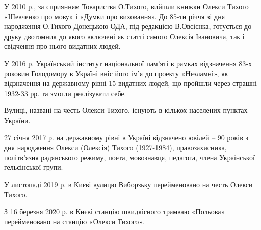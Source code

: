 У 2010 р., за сприянням Товариства О.Тихого, вийшли книжки Олекси Тихого
«Шевченко про мову» і «Думки про виховання». До 85-ти річчя зі дня народження
О.Тихого Донецькою ОДА, під редакцією В.Овсієнка, готується до друку двотомник
до якого включені як статті самого Олексія Івановича, так і свідчення про нього
видатних людей.

У 2016 р. Український інститут національної пам'яті в рамках відзначення 83-х
роковин Голодомору в Україні вніс його ім'я до проекту «Незламні», як
відзначення на державному рівні 15 видатних людей, що пройшли через страшні
1932-33 рр. та змогли реалізувати себе.

Вулиці, названі на честь Олекси Тихого, існують в кількох населених пунктах України. 

27 січня 2017 р. на державному рівні в Україні відзначено ювілей – 90 років з
дня народження Олекси (Олексія) Тихого (1927-1984), правозахисника, політв'язня
радянського режиму, поета, мовознавця, педагога, члена Української гельсінської
групи. 

У листопаді 2019 р. в Києві вулицю Виборзьку перейменовано на честь Олекси Тихого. 

З 16 березня 2020 р. в Києві станцію швидкісного трамваю «Польова»
перейменовано на станцію «Олекси Тихого».
